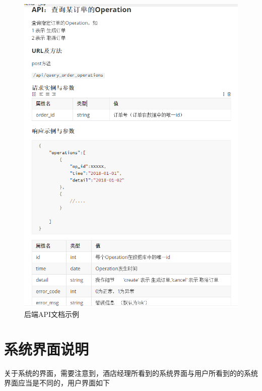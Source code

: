 \documentclass{myreport}
\begin{document}
\begin{figure}[htp]
    \centering
    \includegraphics[width=13cm]{figure/2018-12-22-12-14-27.png}
    \caption{后端API文档示例}
    \label{fig:api-document-example}
\end{figure}


\section{系统界面说明}

关于系统的界面，需要注意到，酒店经理所看到的系统界面与用户所看到的的系统界面应当是不同的，用户界面如下
\end{document}
